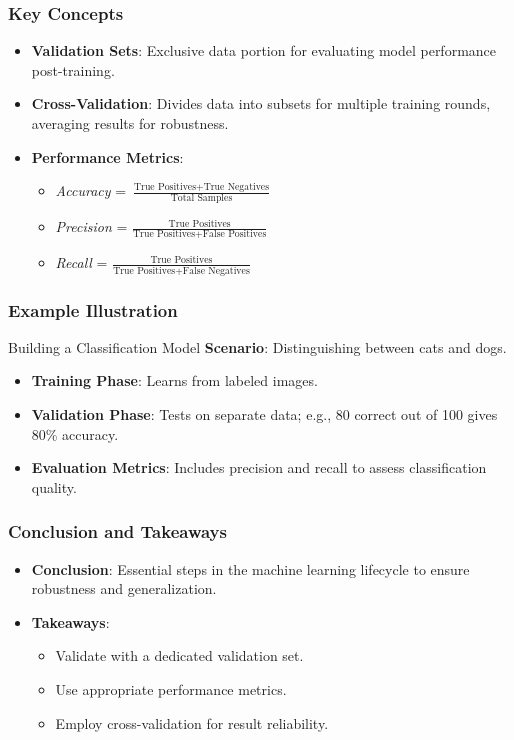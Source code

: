 \documentclass[aspectratio=169]{beamer}
\begin{document}
\begin{frame}[fragile]
    \frametitle{Key Concepts}
    \begin{itemize}
        \item \textbf{Validation Sets}: Exclusive data portion for evaluating model performance post-training.
        \item \textbf{Cross-Validation}: Divides data into subsets for multiple training rounds, averaging results for robustness.
        \item \textbf{Performance Metrics}:
        \begin{itemize}
            \item \textit{Accuracy} = $\frac{\text{True Positives} + \text{True Negatives}}{\text{Total Samples}}$
            \item \textit{Precision} = $\frac{\text{True Positives}}{\text{True Positives} + \text{False Positives}}$
            \item \textit{Recall} = $\frac{\text{True Positives}}{\text{True Positives} + \text{False Negatives}}$
        \end{itemize}
    \end{itemize}
\end{frame}

\begin{frame}[fragile]
    \frametitle{Example Illustration}
    \begin{block}{Building a Classification Model}
        \textbf{Scenario}: Distinguishing between cats and dogs.
        
        \begin{itemize}
            \item \textbf{Training Phase}: Learns from labeled images.
            \item \textbf{Validation Phase}: Tests on separate data; e.g., 80 correct out of 100 gives 80\% accuracy.
            \item \textbf{Evaluation Metrics}: Includes precision and recall to assess classification quality.
        \end{itemize}
    \end{block}
\end{frame}

\begin{frame}[fragile]
    \frametitle{Conclusion and Takeaways}
    \begin{itemize}
        \item \textbf{Conclusion}: Essential steps in the machine learning lifecycle to ensure robustness and generalization.
        \item \textbf{Takeaways}:
        \begin{itemize}
            \item Validate with a dedicated validation set.
            \item Use appropriate performance metrics.
            \item Employ cross-validation for result reliability.
        \end{itemize}
    \end{itemize}
\end{frame}
\end{document}
